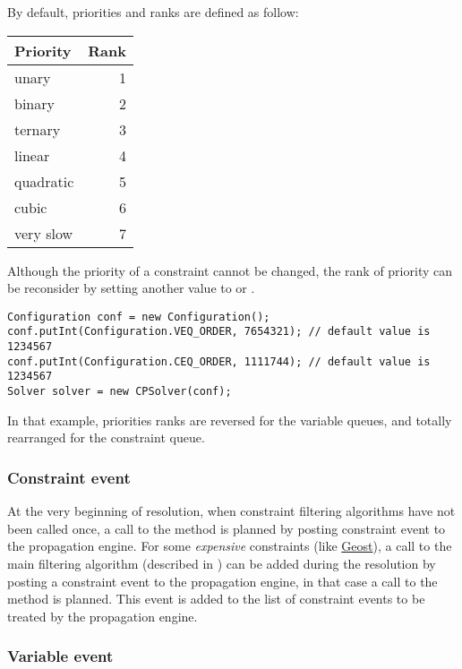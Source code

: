 By default, priorities and ranks are defined as follow:
\begin{tabular}{|l|r|}
\hline
Priority & Rank \\
\hline
unary & 1\\
binary & 2\\
ternary & 3\\
linear & 4\\
quadratic & 5\\
cubic & 6\\
very slow & 7\\
\hline
\end{tabular}
\vspace{0.2cm}

Although the priority of a constraint cannot be changed, the rank of priority can be reconsider by setting another value to  or . 

\vspace{0.5cm}

\begin{lstlisting}
Configuration conf = new Configuration();
conf.putInt(Configuration.VEQ_ORDER, 7654321); // default value is 1234567
conf.putInt(Configuration.CEQ_ORDER, 1111744); // default value is 1234567
Solver solver = new CPSolver(conf);
\end{lstlisting}

In that example, priorities ranks are reversed for the variable queues, and totally rearranged for the constraint queue.


\subsubsection{Constraint event}

At the very beginning of resolution, when constraint filtering algorithms have not been called once, a call to the  method is planned by posting constraint event to the propagation engine. For some \textit{expensive} constraints (like \hyperlink{geost:geostconstraint}{Geost}), a call to the main filtering algorithm (described in ) can be added during the resolution by posting a constraint event to the propagation engine, in that case a call to the  method is planned. 
This event is added to the list of constraint events to be treated by the propagation engine.

\subsubsection{Variable event}

